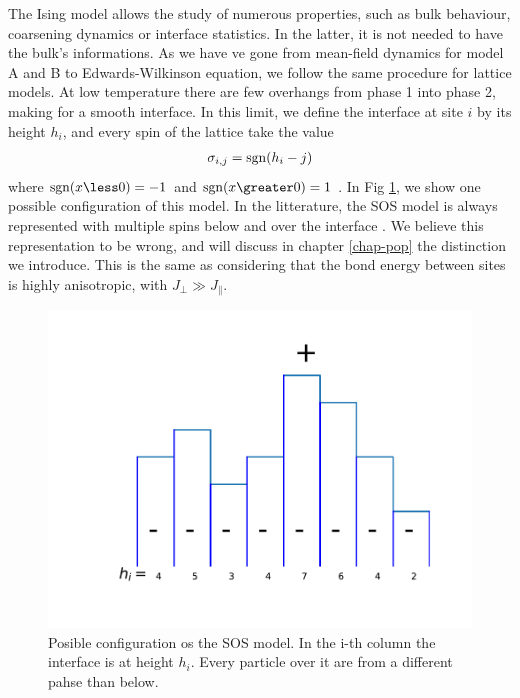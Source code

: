 {\color{red} 

The Ising model allows the study of numerous properties, such as bulk behaviour, coarsening dynamics or interface statistics. In the latter, it is not needed to have the bulk's informations. As we have ve gone from mean-field dynamics for model A and B to Edwards-Wilkinson equation, we follow the same procedure for lattice models.
At low temperature there are few overhangs from phase 1 into phase 2, making for a smooth interface. In this limit, we define the interface at site $i$ by its height $h_i$, and every spin of the lattice take the value
\begin{align*}
	\sigma_{i,j} = \operatorname{sgn}(h_i-j)
\end{align*}
where $\sgn(x \less 0) = -1$ and $\sgn(x \greater 0) = 1$ .  In Fig \ref{figure-sos}, we show one possible configuration of this model. In the litterature, the SOS model is always represented with multiple spins below and over the interface \cite{van_leeuwen_pinning_1981}. We believe this representation to be wrong, and will discuss in chapter \ref{chap-pop} the distinction we introduce. 
This is the same as considering that the bond energy between sites is highly anisotropic, with $J_\perp \gg J_\parallel$.

\begin{figure}
	\centering
	\includegraphics[scale=1]{int-dyn/sos-indiscernable.pdf}
	\caption{Posible configuration os the SOS model. In the i-th column the interface is at height $h_i$. Every particle over it are from a different pahse than below. }
    \label{figure-sos}
\end{figure}

}
